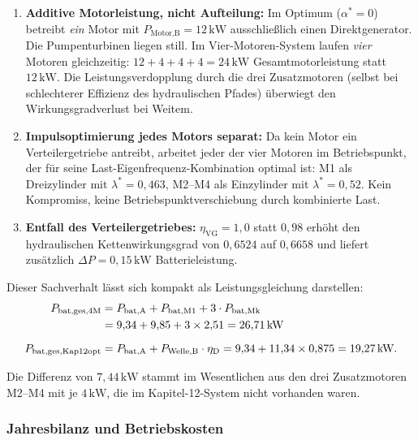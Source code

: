 ﻿\documentclass[a4paper,12pt]{article}
\begin{document}
\begin{enumerate}
  \item \textbf{Additive Motorleistung, nicht Aufteilung:}
    Im Optimum ($\alpha^* = 0$) betreibt \textit{ein} Motor
    mit $P_\text{Motor,B} = 12\,\text{kW}$ ausschließlich einen
    Direktgenerator. Die Pumpenturbinen liegen still.
    Im Vier-Motoren-System laufen \textit{vier} Motoren gleichzeitig:
    $12 + 4 + 4 + 4 = 24\,\text{kW}$ Gesamtmotorleistung statt $12\,\text{kW}$.
    Die Leistungsverdopplung durch die drei Zusatzmotoren
    (selbst bei schlechterer Effizienz des hydraulischen Pfades)
    überwiegt den Wirkungsgradverlust bei Weitem.

  \item \textbf{Impulsoptimierung jedes Motors separat:}
    Da kein Motor ein Verteilergetriebe antreibt, arbeitet
    jeder der vier Motoren im Betriebspunkt, der für seine
    Last-Eigenfrequenz-Kombination optimal ist:
    M1 als Dreizylinder mit $\lambda^* = 0{,}463$,
    M2--M4 als Einzylinder mit $\lambda^* = 0{,}52$.
    Kein Kompromiss, keine Betriebspunktverschiebung durch
    kombinierte Last.

  \item \textbf{Entfall des Verteilergetriebes:}
    $\eta_\text{VG} = 1{,}0$ statt $0{,}98$ erhöht den
    hydraulischen Kettenwirkungsgrad von $0{,}6524$ auf $0{,}6658$
    und liefert zusätzlich $\Delta P = 0{,}15\,\text{kW}$
    Batterieleistung.
\end{enumerate}

Dieser Sachverhalt lässt sich kompakt als Leistungsgleichung darstellen:
\begin{align}
  P_\text{bat,ges,4M}
    &= P_\text{bat,A} + P_\text{bat,M1} + 3 \cdot P_\text{bat,Mk} \notag \\
    &= 9{,}34 + 9{,}85 + 3 \times 2{,}51
     = 26{,}71\,\text{kW}
     \label{eq:P_bat_4M_aufschluss} \\[6pt]
  P_\text{bat,ges,Kap12opt}
    &= P_\text{bat,A} + P_\text{Welle,B} \cdot \eta_\text{D}
     = 9{,}34 + 11{,}34 \times 0{,}875
     = 19{,}27\,\text{kW}.
  \label{eq:P_bat_Kap12opt_aufschluss}
\end{align}

Die Differenz von $7{,}44\,\text{kW}$ stammt im Wesentlichen aus
den drei Zusatzmotoren M2--M4 mit je $4\,\text{kW}$, die im
Kapitel-12-System nicht vorhanden waren.

\subsubsection{Jahresbilanz und Betriebskosten}
\end{document}
